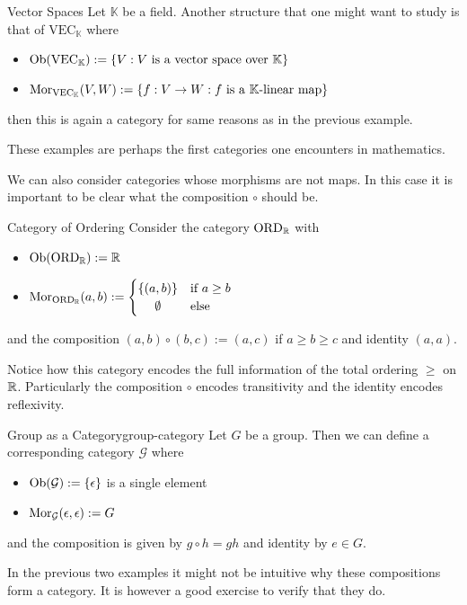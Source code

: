 \begin{example}{Vector Spaces}{}
Let $\mathbb{K}$ be a field. Another structure that one might want to study is that of $\mathrm{VEC}_\mathbb{K}$ where
\begin{itemize}
    \item $\mathrm {Ob}(\mathrm{VEC}_\mathbb{K}) := \{V : \text{$V$ is a vector space over $\mathbb{K}$}\}$
    \item $\mathrm {Mor}_{\mathrm{VEC}_\mathbb{K}}(V,W) := \{f: V \to W : \text{$f$ is a $\mathbb{K}$-linear map}\}$
\end{itemize}
then this is again a category for same reasons as in the previous example.
\end{example}
These examples are perhaps the first categories one encounters in mathematics. 

We can also consider categories whose morphisms are not maps. In this case it is important to be clear what the composition $\circ$ should be.

\begin{example}{Category of Ordering}{}
Consider the category $\mathrm{ORD}_\mathbb R$ with
\begin{itemize}
    \item $\mathrm {Ob}(\mathrm{ORD}_\mathbb R) := \mathbb R$
    \item $\mor_{\mathrm{ORD}_\R}(a,b) := \begin{cases}
        \{(a,b)\} & \text{if $a \ge b$} \\
        \hfil \emptyset & \text{else}
    \end{cases}$
\end{itemize}
and the composition $(a,b) \circ (b,c) := (a,c)$ if $a \ge b \ge c$ and identity $(a,a)$.

Notice how this category encodes the full information of the total ordering $\ge$ on $\mathbb R$. Particularly the composition $\circ$ encodes transitivity and the identity encodes reflexivity.
\end{example}

\begin{example}{Group as a Category}{group-category}
Let $G$ be a group. Then we can define a corresponding category $\mathcal{G}$ where
\begin{itemize}
    \item $\mathrm {Ob}(\mathcal{G}) := \{\epsilon\}$ is a single element
    \item $\mathrm {Mor}_{\mathcal{G}}(\epsilon,\epsilon) := G$
\end{itemize}
and the composition is given by $g \circ h = gh$ and identity by $e \in G$.
\end{example}
In the previous two examples it might not be intuitive why these compositions form a category. It is however a good exercise to verify that they do.


